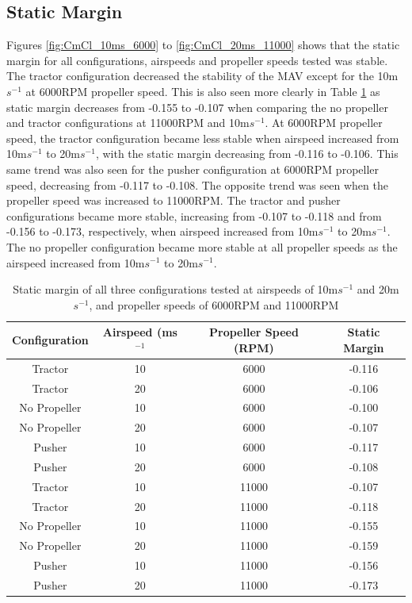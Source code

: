\subsection{Static Margin}
Figures \ref{fig:CmCl_10ms_6000} to \ref{fig:CmCl_20ms_11000} shows that the static margin for all configurations, airspeeds and propeller speeds tested was stable. The tractor configuration decreased the stability of the MAV except for the 10m$s^{-1}$ at 6000RPM propeller speed. This is also seen more clearly in Table \ref{tab:staticMargin} as static margin decreases from -0.155 to -0.107 when comparing the no propeller and tractor configurations at 11000RPM and  10m$s^{-1}$. At 6000RPM propeller speed, the tractor configuration became less stable when airspeed increased from 10m$s^{-1}$ to 20m$s^{-1}$, with the static margin decreasing from -0.116 to -0.106. This same trend was also seen for the pusher configuration at 6000RPM propeller speed, decreasing from -0.117 to -0.108. The opposite trend was seen when the propeller speed was increased to 11000RPM. The tractor and pusher configurations became more stable, increasing from -0.107 to -0.118 and from -0.156 to -0.173, respectively, when airspeed increased from 10m$s^{-1}$ to 20m$s^{-1}$. The no propeller configuration became more stable at all propeller speeds as the airspeed increased from 10m$s^{-1}$ to 20m$s^{-1}$.

\begin{table}
\caption{Static margin of all three configurations tested at airspeeds of 10m$s^{-1}$ and 20m$s^{-1}$, and propeller speeds of 6000RPM and 11000RPM}
\begin{tabular}{ |c|c|c|c| }

 \hline
 Configuration & Airspeed (ms$^{-1}$ &  Propeller Speed (\acrshort{RPM}) & Static Margin\\
 \hline
 Tractor & 10 & 6000 & -0.116 \\
 Tractor & 20 & 6000 & -0.106\\
No Propeller & 10 & 6000 & -0.100\\
  No Propeller & 20 & 6000 & -0.107 \\
 Pusher & 10 & 6000 & -0.117 \\
  Pusher & 20 & 6000 & -0.108 \\
  \hline
 Tractor & 10 & 11000 & -0.107 \\
 Tractor & 20 & 11000 & -0.118\\
 No Propeller & 10 & 11000 & -0.155\\
 No Propeller& 20 & 11000 & -0.159\\
 Pusher & 10 & 11000 & -0.156 \\
 Pusher & 20 & 11000 & -0.173 \\
 \hline
 

\end{tabular}
 \label{tab:staticMargin}
\end{table}
 


